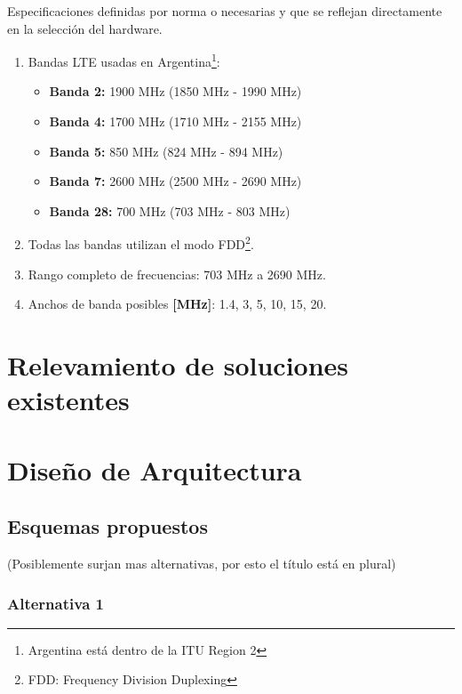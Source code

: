 \documentclass[a4paper,12pt]{report} %
\begin{document}
Especificaciones definidas por norma o necesarias y que se reflejan directamente en la selección del hardware.

\begin{enumerate}
	\item Bandas LTE usadas en Argentina\footnote{Argentina está dentro de la ITU Region 2}:
	\begin{itemize}
		\item \textbf{Banda 2:} 1900 MHz (1850 MHz - 1990 MHz)
		\item \textbf{Banda 4:} 1700 MHz (1710 MHz - 2155 MHz)
		\item \textbf{Banda 5:} 850 MHz (824 MHz - 894 MHz)
		\item \textbf{Banda 7:} 2600 MHz (2500 MHz - 2690 MHz)
		\item \textbf{Banda 28:} 700 MHz (703 MHz - 803 MHz)
	\end{itemize}
	\item Todas las bandas utilizan el modo FDD\footnote{FDD: Frequency Division Duplexing}.
	\item Rango completo de frecuencias: 703 MHz a 2690 MHz.
	\item Anchos de banda posibles \textbf{[MHz]}: 1.4, 3, 5, 10, 15, 20.
\end{enumerate}


\chapter{Relevamiento de soluciones existentes}

\chapter{Diseño de Arquitectura}

\section{Esquemas propuestos}

(Posiblemente surjan mas alternativas, por esto el título está en plural)

\subsection{Alternativa 1}
\end{document}
